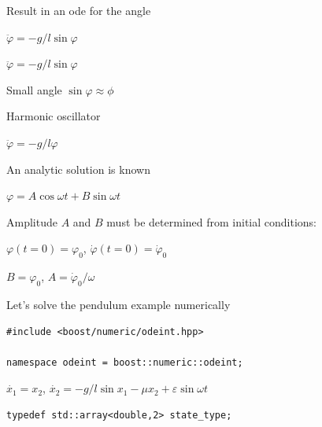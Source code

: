 \begin{frame}[fragile]
\begin{minipage}{0.5\textwidth}
{ Result in an ode for the angle

 $\ddot{\varphi} = - g / l \sin \varphi $
 }

 {

 $\ddot{\varphi} = - g / l \sin \varphi $

 Small angle $\sin \varphi \approx \phi$

 Harmonic oscillator

 $\ddot{\varphi} = - g / l \varphi$

 An analytic solution is known

 $\varphi = A \cos \omega t + B \sin \omega t$

 Amplitude $A$ and $B$ must be determined from initial conditions:

 $\varphi(t=0) = \varphi_0$, $\dot{\varphi}(t=0) = \dot{\varphi}_0$

 $B=\varphi_0$, $A=\dot{\varphi}_0 / \omega$

 }


 
\end{minipage}

 
\end{frame}


\begin{frame}[fragile]

\centerline{ \Large Let's solve the pendulum example numerically}


\begin{lstlisting}
#include <boost/numeric/odeint.hpp>

namespace odeint = boost::numeric::odeint;
\end{lstlisting}

$\dot{x_1} = x_2$, $\dot{x_2} = - g / l \sin x_1 - \mu x_2 + \varepsilon \sin \omega t$
\begin{lstlisting}
typedef std::array<double,2> state_type;
\end{lstlisting}

\end{frame}

